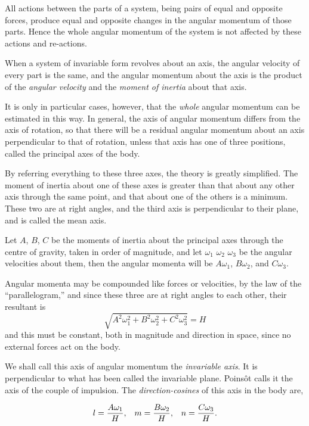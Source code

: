 \documentclass[12pt]{article}
\begin{document}
All actions between the parts of a system, being pairs of equal and
opposite forces, produce equal and opposite changes in the angular
momentum of those parts.  Hence the whole angular momentum of the
system is not affected by these actions and re-actions.

\footnotemark[1]When a system of invariable form revolves about an
axis, the angular velocity of every part is the same, and the angular
momentum about the axis is the product of the \emph{angular velocity}
and the \emph{moment of inertia} about that axis.

\footnotemark[1]It is only in particular cases, however, that the
\emph{whole} angular momentum can be estimated in this way.  In
general, the axis of angular momentum differs from the axis of
rotation, so that there will be a residual angular momentum about an
axis perpendicular to that of rotation, unless that axis has one of
three positions, called the principal axes of the body.

By referring everything to these three axes, the theory is greatly
simplified.  The moment of inertia about one of these axes is greater
than that about any other axis through the same point, and that about
one of the others is a minimum.  These two are at right angles, and
the third axis is perpendicular to their plane, and is called the mean
axis.

\footnotemark[1]Let $A$, $B$, $C$ be the moments of inertia about the
principal axes through the centre of gravity, taken in order of
magnitude, and let $\omega_1$ $\omega_2$ $\omega_3$ be the angular
velocities about them, then the angular momenta will be $A\omega_1$,
$B\omega_2$, and $C\omega_3$.

Angular momenta may be compounded like forces or velocities, by the
law of the ``parallelogram,'' and since these three are at right angles
to each other, their resultant is
%
\begin{equation}
\sqrt{A^2\omega_1^2 + B^2\omega_2^2 + C^2\omega_3^2} = H
\end{equation}
%
and this must be constant, both in magnitude and direction in space,
since no external forces act on the body.

We shall call this axis of angular momentum the \emph{invariable
axis}.  It is perpendicular to what has been called the invariable
plane.  Poins\^ot calls it the axis of the couple of impulsion.  The
\emph{direction-cosines} of this axis in the body are,

\begin{displaymath}
\begin{array}{c c c}
\displaystyle l = \frac{A\omega_1}{H}, &
\displaystyle m = \frac{B\omega_2}{H}, & 
\displaystyle n = \frac{C\omega_3}{H}.
\end{array}
\end{displaymath}
\end{document}

